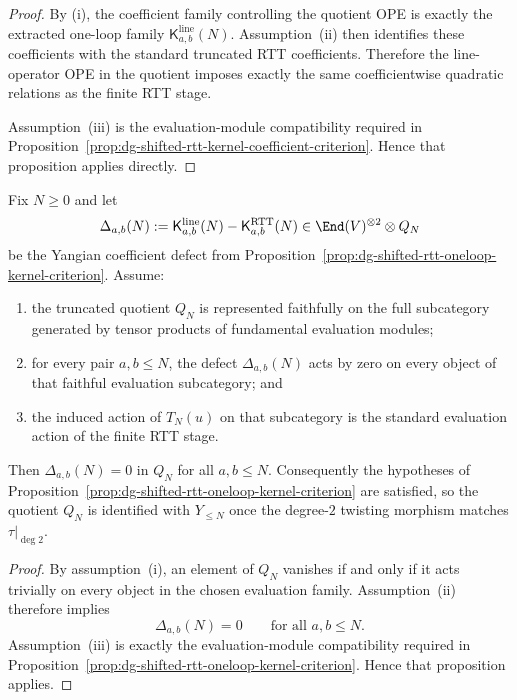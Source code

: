\begin{proof}
By \textup{(i)}, the coefficient family controlling the quotient OPE is
exactly the extracted one-loop family
$\mathsf{K}^{\mathrm{line}}_{a,b}(N)$.  Assumption~\textup{(ii)} then
identifies these coefficients with the standard truncated RTT
coefficients.  Therefore the line-operator OPE in the quotient imposes
exactly the same coefficientwise quadratic relations as the finite RTT
stage.

Assumption~\textup{(iii)} is the evaluation-module compatibility
required in
Proposition~\ref{prop:dg-shifted-rtt-kernel-coefficient-criterion}.
Hence that proposition applies directly.
\end{proof}

\begin{proposition}
\label{prop:dg-shifted-rtt-evaluation-detection}
Fix $N \ge 0$ and let
\[
\Delta_{a,b}(N):=
\mathsf{K}^{\mathrm{line}}_{a,b}(N)
-\mathsf{K}^{\mathrm{RTT}}_{a,b}(N)
\in \End(V)^{\otimes 2}\otimes Q_N
\]
be the Yangian coefficient defect from
Proposition~\ref{prop:dg-shifted-rtt-oneloop-kernel-criterion}.  Assume:
\begin{enumerate}[label=\textup{(\roman*)}]
\item the truncated quotient $Q_N$ is represented faithfully on the full
  subcategory generated by tensor products of fundamental evaluation
  modules;
\item for every pair $a,b \le N$, the defect $\Delta_{a,b}(N)$ acts by
  zero on every object of that faithful evaluation subcategory; and
\item the induced action of $T_N(u)$ on that subcategory is the standard
  evaluation action of the finite RTT stage.
\end{enumerate}
Then $\Delta_{a,b}(N)=0$ in $Q_N$ for all $a,b \le N$.  Consequently the
hypotheses of
Proposition~\ref{prop:dg-shifted-rtt-oneloop-kernel-criterion} are
satisfied, so the quotient $Q_N$ is identified with $Y_{\le N}$ once the
degree-$2$ twisting morphism matches $\tau|_{\deg 2}$.
\end{proposition}

\begin{proof}
By assumption~\textup{(i)}, an element of $Q_N$ vanishes if and only if
it acts trivially on every object in the chosen evaluation family.
Assumption~\textup{(ii)} therefore implies
\[
\Delta_{a,b}(N)=0
\qquad\text{for all } a,b \le N.
\]
Assumption~\textup{(iii)} is exactly the evaluation-module compatibility
required in
Proposition~\ref{prop:dg-shifted-rtt-oneloop-kernel-criterion}.  Hence
that proposition applies.
\end{proof}


